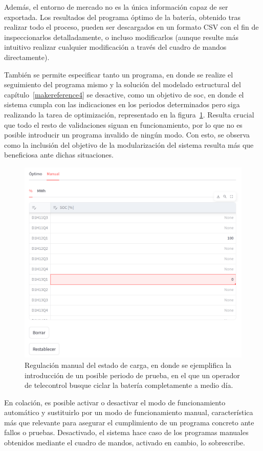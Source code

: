 Además, el entorno de mercado no es la única información capaz de ser exportada. Los resultados del programa óptimo de la batería, obtenido tras realizar todo el proceso, pueden ser descargados en un formato CSV con el fin de inspeccionarlos detalladamente, o incluso modificarlos (aunque resulte más intuitivo realizar cualquier modificación a través del cuadro de mandos directamente).

También se permite especificar tanto un programa, en donde se realize el seguimiento del programa mismo y la solución del modelado estructural del capítulo~\ref{makereference4} se desactive, como un objetivo de \gls{soc}, en donde el sistema cumpla con las indicaciones en los periodos determinados pero siga realizando la tarea de optimización, representado en la figura~\ref{fig:soc-manual}. Resulta crucial que todo el resto de validaciones siguan en funcionamiento, por lo que no es posible introducir un programa invalido de ningún modo. Con esto, se observa como la inclusión del objetivo de la modularización del sistema resulta más que beneficiosa ante dichas situaciones.

\begin{figure}
  \centering
  \includegraphics[width=0.5\linewidth]{figures/soc-manual.png}
  \caption[Regulación manual del estado de carga.]{Regulación manual del estado de carga, en donde se ejemplifica la introducción de un posible periodo de prueba, en el que un operador de telecontrol busque ciclar la batería completamente a medio día.}
  \label{fig:soc-manual}
\end{figure}

En colación, es posible activar o desactivar el modo de funcionamiento automático y sustituirlo por un modo de funcionamiento manual, característica más que relevante para asegurar el cumplimiento de un programa concreto ante fallos o pruebas. Desactivado, el sistema hace caso de los programas manuales obtenidos mediante el cuadro de mandos, activado en cambio, lo sobrescribe.

